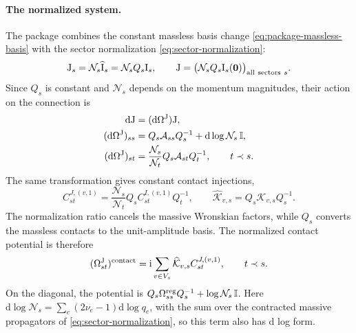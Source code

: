 \documentclass[11pt,a4paper]{article}
\numberwithin{table}{section}
\newcommand{\nn}{\nonumber}
\newcommand{\nd}{\mathrm{d}}
\newcommand{\ii}{\mathrm i}
\newcommand{\Id}{\mathbb I}
\newcommand{\cN}{\mathcal N}
\begin{document}
\paragraph{The normalized system.}
The package combines the constant massless basis change \eqref{eq:package-massless-basis}
with the sector normalization \eqref{eq:sector-normalization}:
\begin{equation}
  \bm{\text J}_s=\cN_s\widehat{\bm{\text I}}_s=\cN_s Q_s\bm{\text I}_s,
  \qquad
  \bm{\text J}=\bigl(\cN_s Q_s\bm{\text I}_s(\bm 0)\bigr)_{{\rm all\ sectors}\ s}.
  \label{eq:normalized-vector}
\end{equation}
Since $Q_s$ is constant and $\cN_s$ depends on the momentum magnitudes, their action on the
connection is
\begin{align}
  \nd\bm{\text J}&=(\nd\Omega^{\rm J})\bm{\text J},\nn\\
  (\nd\Omega^{\rm J})_{ss}
  &=Q_s\mathcal A_{ss}Q_s^{-1}+\nd\log\cN_s\,\Id,\nn\\
  (\nd\Omega^{\rm J})_{st}
  &=\frac{\cN_s}{\cN_t}Q_s\mathcal A_{st}Q_t^{-1},\qquad t\prec s.
  \label{eq:normalized-de}
\end{align}
The same transformation gives constant contact injections,
\begin{equation}
  C^{J,(v,1)}_{st}=\frac{\cN_s}{\cN_t}Q_s C^{I,(v,1)}_{st}Q_t^{-1},
  \qquad
  \widehat{\mathcal K}_{v,s}=Q_s\mathcal K_{v,s}Q_s^{-1}.
  \label{eq:normalized-contact-injection}
\end{equation}
The normalization ratio cancels the massive Wronskian factors, while $Q_s$ converts the
massless contacts to the unit-amplitude basis. The normalized contact potential is therefore
\begin{equation}
  (\Omega^{\rm J}_{st})^{\rm contact}
  =\ii\sum_{v\in V_s}\widehat{\mathcal K}_{v,s}C^{J,(v,1)}_{st},
  \qquad t\prec s.
  \label{eq:contact-omega}
\end{equation}
On the diagonal, the potential is $Q_s\Omega^{\rm reg}_{ss}Q_s^{-1}+\log\cN_s\,\Id$.
Here $\nd\log\cN_s=\sum_e(2\nu_e-1)\nd\log q_e$, with the sum over the contracted
massive propagators of \eqref{eq:sector-normalization}, so this term also has d log form.
\end{document}
